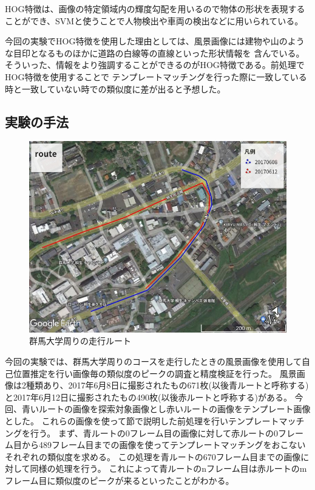 \documentclass[titlepage,dvipdfmx]{jsarticle}
\begin{document}
HOG特徴は、画像の特定領域内の輝度勾配を用いるので物体の形状を表現することができ、SVMと使うことで人物検出や車両の検出などに用いられている。

今回の実験でHOG特徴を使用した理由としては、風景画像には建物や山のような目印となるものほかに道路の白線等の直線といった形状情報を
含んでいる。そういった、情報をより強調することができるのがHOG特徴である。前処理でHOG特徴を使用することで
テンプレートマッチングを行った際に一致している時と一致していない時での類似度に差が出ると予想した。

\subsection{実験の手法}

\begin{figure}[t]
  \centering
  \includegraphics[pagebox=cropbox, scale=0.6]{route.jpg}
  \caption{群馬大学周りの走行ルート}
  \label{route}
\end{figure}
今回の実験では、群馬大学周りのコースを走行したときの風景画像を使用して自己位置推定を行い画像毎の類似度のピークの調査と精度検証を行った。
風景画像は2種類あり、2017年6月8日に撮影されたもの671枚(以後青ルートと呼称する)と2017年6月12日に撮影されたもの490枚(以後赤ルートと呼称する)がある。
今回、青いルートの画像を探索対象画像とし赤いルートの画像をテンプレート画像とした。
これらの画像を使って節で説明した前処理を行いテンプレートマッチングを行う。
まず、青ルートの0フレーム目の画像に対して赤ルートの0フレーム目から489フレーム目までの画像を使ってテンプレートマッチングをおこないそれぞれの類似度を求める。
この処理を青ルートの670フレーム目までの画像に対して同様の処理を行う。
これによって青ルートのnフレーム目は赤ルートのmフレーム目に類似度のピークが来るといったことがわかる。
\end{document}
